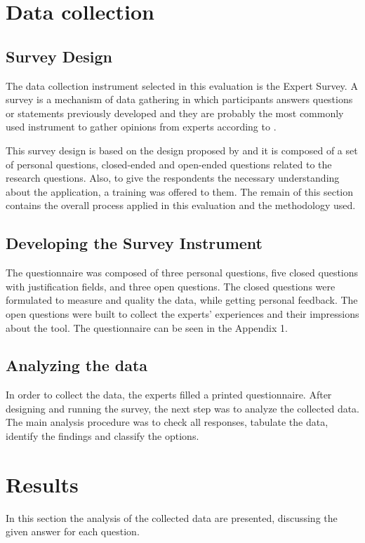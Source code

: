 \section{Data collection}
\label{sc:researchMethod}

\subsection{Survey Design}
The data collection instrument selected in this evaluation is the Expert Survey. A survey is a 
mechanism of data gathering in which participants answers questions or statements previously 
developed and they are probably the most commonly used instrument to gather opinions from experts 
according to \citep{Kitchenham2008}.

This survey design is based on the design proposed by \citep{Kitchenham2008} and it is 
composed of a set of personal questions, closed-ended and open-ended questions related to the research 
questions. Also, to give the respondents the necessary understanding about the application, a training 
was offered to them. The remain of this section contains the overall process applied in this evaluation 
and the methodology used. 
\subsection{Developing the Survey Instrument}
The questionnaire was composed of three personal questions, five closed
questions with justification fields, and three open questions. The closed questions were 
formulated to measure and quality the data, while getting personal feedback. The open questions 
were built to collect the experts’ experiences and their impressions about the tool. The questionnaire 
can be seen in the Appendix 1.

\subsection{Analyzing the data}
In order to collect the data, the experts filled a printed questionnaire. After designing and running 
the survey, the next step was to analyze the collected data. The main analysis procedure was to check 
all responses, tabulate the data, identify the findings and classify the options.

\section{Results}
\label{sc:datacollection}
In this section the analysis of the collected data are presented, discussing the
given answer for each question.

